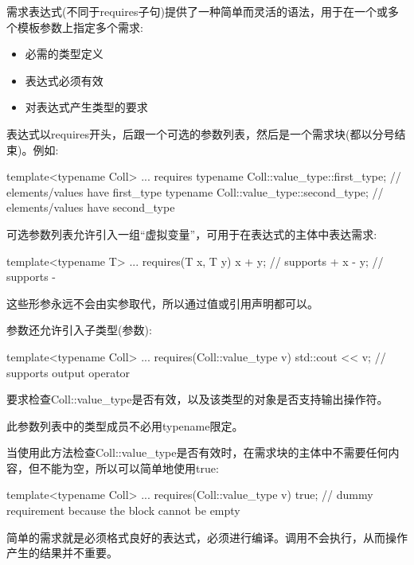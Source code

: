 

需求表达式(不同于requires子句)提供了一种简单而灵活的语法，用于在一个或多个模板参数上指定多个需求:

\begin{itemize}
\item
必需的类型定义

\item
表达式必须有效

\item
对表达式产生类型的要求
\end{itemize}

表达式以requires开头，后跟一个可选的参数列表，然后是一个需求块(都以分号结束)。例如:

\begin{cpp}
template<typename Coll>
... requires {
		typename Coll::value_type::first_type; // elements/values have first_type
		typename Coll::value_type::second_type; // elements/values have second_type
	}
\end{cpp}

可选参数列表允许引入一组“虚拟变量”，可用于在表达式的主体中表达需求:

\begin{cpp}
template<typename T>
... requires(T x, T y) {
		x + y; // supports +
		x - y; // supports -
	}
\end{cpp}

这些形参永远不会由实参取代，所以通过值或引用声明都可以。

参数还允许引入子类型(参数):

\begin{cpp}
template<typename Coll>
... requires(Coll::value_type v) {
		std::cout << v; // supports output operator
	}
\end{cpp}

要求检查Coll::value\_type是否有效，以及该类型的对象是否支持输出操作符。

此参数列表中的类型成员不必用typename限定。

当使用此方法检查Coll::value\_type是否有效时，在需求块的主体中不需要任何内容，但不能为空，所以可以简单地使用true:

\begin{cpp}
template<typename Coll>
... requires(Coll::value_type v) {
		true; // dummy requirement because the block cannot be empty
	}
\end{cpp}


简单的需求就是必须格式良好的表达式，必须进行编译。调用不会执行，从而操作产生的结果并不重要。

